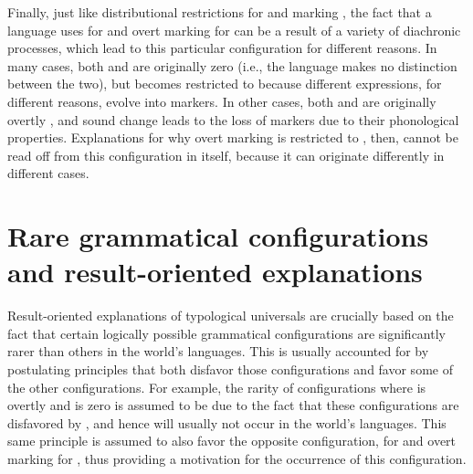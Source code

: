 \documentclass[output=paper]{langsci/langscibook}
\begin{document}
Finally, just like distributional restrictions for  and
  marking , the fact that a language uses  for 
and overt marking for  can be a result of a variety of
diachronic processes,
 which lead to this particular configuration for different
reasons.  
In many cases, both  and  are originally zero
 (i.e., the language makes no distinction between the two), but
 becomes restricted to  because different expressions, for different reasons, evolve into 
markers.  In other cases, both
 and  are originally overtly , and sound change
leads to the loss of  markers due to their phonological
properties. Explanations for why overt marking is restricted to , then,  cannot be read off from this configuration in itself,
because it can originate differently in different cases.


\section{Rare grammatical configurations and result-oriented explanations}\label{martin}

Result-oriented explanations of typological universals are crucially
 based on
the fact that certain logically possible grammatical configurations
are significantly rarer than
others in the world's languages. This is usually accounted for by
postulating  principles that both disfavor those configurations
and favor some of the other configurations. For
example, the rarity of configurations where  is
overtly  and  is zero  is assumed to be due to the
fact that these configurations are disfavored by , and hence
will usually not occur in  the world's languages. This same
principle is assumed to also favor the opposite configuration,  for
 and overt marking for , thus providing a motivation for
the occurrence of this configuration.
\end{document}
